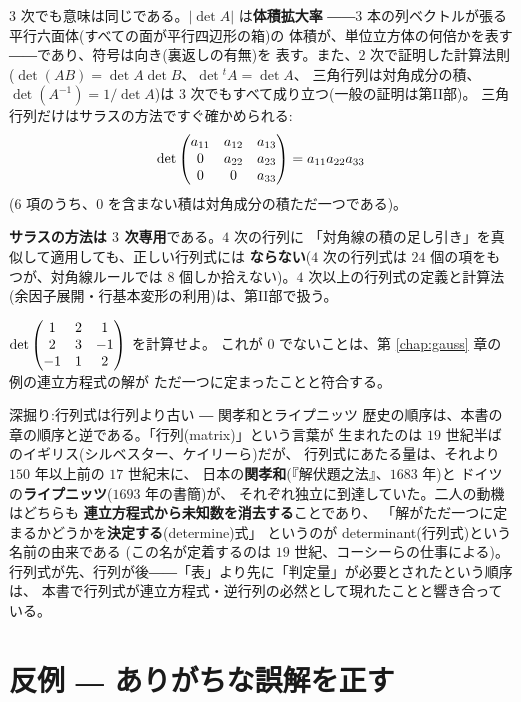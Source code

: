 $3$ 次でも意味は同じである。$|\det A|$ は\textbf{体積拡大率}
――$3$ 本の列ベクトルが張る平行六面体(すべての面が平行四辺形の箱)の
体積が、単位立方体の何倍かを表す――であり、符号は向き(裏返しの有無)を
表す。また、$2$ 次で証明した計算法則
($\det(AB) = \det A \det B$、$\det {}^t\!A = \det A$、
三角行列は対角成分の積、$\det(A^{-1}) = 1/\det A$)は
$3$ 次でもすべて成り立つ(一般の証明は第II部)。
三角行列だけはサラスの方法ですぐ確かめられる:
\[
\det \begin{pmatrix}a_{11} & a_{12} & a_{13} \\ 0 & a_{22} & a_{23} \\ 0 & 0 & a_{33}\end{pmatrix}
= a_{11}a_{22}a_{33}
\]
($6$ 項のうち、$0$ を含まない積は対角成分の積ただ一つである)。

\begin{chui}
\textbf{サラスの方法は $3$ 次専用}である。$4$ 次の行列に
「対角線の積の足し引き」を真似して適用しても、正しい行列式には
\textbf{ならない}($4$ 次の行列式は $24$ 個の項をもつが、対角線ルールでは
$8$ 個しか拾えない)。$4$ 次以上の行列式の定義と計算法
(余因子展開・行基本変形の利用)は、第II部で扱う。
\end{chui}

\begin{mondai}\label{q:det3}    %
$\det \begin{pmatrix}1 & 2 & 1 \\ 2 & 3 & -1 \\ -1 & 1 & 2\end{pmatrix}$ を計算せよ。
これが $0$ でないことは、第 \ref{chap:gauss} 章の例の連立方程式の解が
ただ一つに定まったことと符合する。
\end{mondai}

\begin{itembox}[l]{深掘り:行列式は行列より古い ― 関孝和とライプニッツ}
歴史の順序は、本書の章の順序と逆である。「行列(matrix)」という言葉が
生まれたのは $19$ 世紀半ばのイギリス(シルベスター、ケイリーら)だが、
行列式にあたる量は、それより $150$ 年以上前の $17$ 世紀末に、
日本の\textbf{関孝和}(『解伏題之法』、$1683$ 年)と
ドイツの\textbf{ライプニッツ}($1693$ 年の書簡)が、
それぞれ独立に到達していた。二人の動機はどちらも
\textbf{連立方程式から未知数を消去する}ことであり、
「解がただ一つに定まるかどうかを\textbf{決定する}(determine)式」
というのが determinant(行列式)という名前の由来である
(この名が定着するのは $19$ 世紀、コーシーらの仕事による)。
行列式が先、行列が後――「表」より先に「判定量」が必要とされたという順序は、
本書で行列式が連立方程式・逆行列の必然として現れたことと響き合っている。
\end{itembox}

\section{反例 ― ありがちな誤解を正す}

